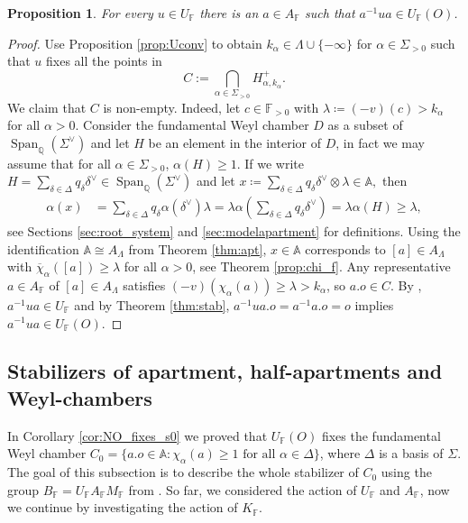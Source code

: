 \documentclass[12pt]{amsart}
\newcommand{\F}{\mathbb{F} }
\newcommand{\Q}{\mathbb{Q} }
\newcommand{\A}{\mathbb{A}}
\numberwithin{equation}{section}
\newtheorem{proposition}[theorem]{Proposition}
\theoremstyle{remark} %
\begin{document}
\begin{proposition}\label{prop:exists_a_NO}
	For every $u \in U_\F$ there is an $a\in A_\F$ such that $a^{-1}ua \in U_\F(O)$.
\end{proposition}
\begin{proof}
	Use Proposition \ref{prop:Uconv} to obtain $k_\alpha \in \Lambda \cup \{-\infty\}$ for $\alpha \in \Sigma_{>0}$ such that $u$ fixes all the points in
	$$
	C:= \bigcap_{\alpha \in \Sigma_{ > 0}} H_{\alpha, k_\alpha}^+.
	$$ 
	We claim that $C$ is non-empty. Indeed, let $c\in \F_{>0}$ with $\lambda \coloneqq (-v)(c) > k_\alpha$ for all $\alpha >0$.
	Consider the fundamental Weyl chamber $D$ as a subset of $\operatorname{Span}_{\Q}(\Sigma^\vee)$ and let $H$ be an element in the interior of $D$, in fact we may assume that for all $\alpha \in \Sigma_{>0}$, $\alpha(H) \geq 1$. If we write $H=\sum_{\delta \in \Delta} q_\delta \delta^\vee \in \operatorname{Span}_\Q(\Sigma^\vee)$ and let
	$
	x \coloneqq \sum_{\delta \in \Delta} q_{\delta} \delta^\vee \otimes \lambda \in \A,
	$
	then 
	\begin{align*}
	\alpha(x) &= \sum_{\delta \in \Delta} q_\delta \alpha(\delta^\vee) \lambda = \lambda \alpha\left( \sum_{\delta \in \Delta} q_\delta \delta^\vee \right)
	= \lambda \alpha(H) \geq \lambda,
    \end{align*}
	see Sections \ref{sec:root_system} and \ref{sec:modelapartment} for definitions. Using the identification $\A \cong A_\Lambda$ from Theorem \ref{thm:apt}, $x\in \A$ corresponds to $[a] \in A_\Lambda$ with $\overline{\chi}_\alpha([a]) \geq \lambda$ for all $\alpha >0$, see Theorem \ref{prop:chi_f}. Any representative $a\in A_\F$ of $[a]\in A_\Lambda$ satisfies $(-v)\left(\chi_\alpha(a) \right) \geq \lambda  > k_\alpha$, so $a.o \in C$.	By \cite[Proposition \ref{I-prop:anainN}]{AppAGRCF}, $a^{-1}ua \in U_\F$ and by Theorem \ref{thm:stab}, $a^{-1}ua.o = a^{-1}a.o=o$ implies $a^{-1}ua \in U_\F(O)$.
\end{proof}


\subsection{Stabilizers of apartment, half-apartments and Weyl-chambers} \label{sec:stab_apt_halfapt_chambers}

In Corollary \ref{cor:NO_fixes_s0} we proved that $U_\F(O)$ fixes the fundamental Weyl chamber $C_0 = \{ a.o \in \A  \colon \chi_\alpha(a) \geq 1 \text{ for all } \alpha \in \Delta \}$, where $\Delta$ is a basis of $\Sigma$. The goal of this subsection is to describe the whole stabilizer of $C_0$ using the group $B_\F=U_\F A_\F M_\F$ from \cite[Section \ref{I-sec:BWB}]{AppAGRCF}. So far, we considered the action of $U_\F$ and $A_\F$, now we continue by investigating the action of $K_\F$. 
\end{document}
